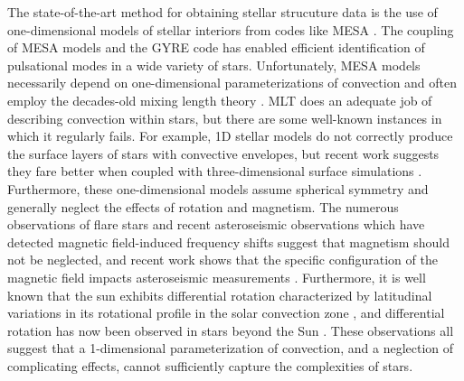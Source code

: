 \documentclass[aasms,12pt]{article}
\begin{document}
The state-of-the-art method for obtaining stellar strucuture data is the use of one-dimensional models of stellar interiors from codes like MESA \citep{paxton&all2011}.
The coupling of MESA models and the GYRE code \citep{townsend&teitler2013} has enabled efficient identification of pulsational modes in a wide variety of stars.
Unfortunately, MESA models necessarily depend on one-dimensional parameterizations of convection and often employ the decades-old mixing length theory \citep[MLT,][]{bohm-vitense1958}.
MLT does an adequate job of describing convection within stars, but there are some well-known instances in which it regularly fails.
For example, 1D stellar models do not correctly produce the surface layers of stars with convective envelopes, but recent work suggests they fare better when coupled with three-dimensional surface simulations \citep{jorgensen&weiss2019}.
Furthermore, these one-dimensional models assume spherical symmetry and generally neglect the effects of rotation and magnetism.
The numerous observations of flare stars and recent asteroseismic observations which have detected magnetic field-induced frequency shifts \citep{santos&all2018} suggest that magnetism should not be neglected, and recent work shows that the specific configuration of the magnetic field impacts asteroseismic measurements \citep{thomas&all2019}.
Furthermore, it is well known that the sun exhibits differential rotation characterized by latitudinal variations in its rotational profile in the solar convection zone \citep{thompson&all1996, schou&all1998}, and differential rotation has now been observed in stars beyond the Sun \citep{benomar&all2018}.
These observations all suggest that a 1-dimensional parameterization of convection, and a neglection of complicating effects, cannot sufficiently capture the complexities of stars.
\end{document}
